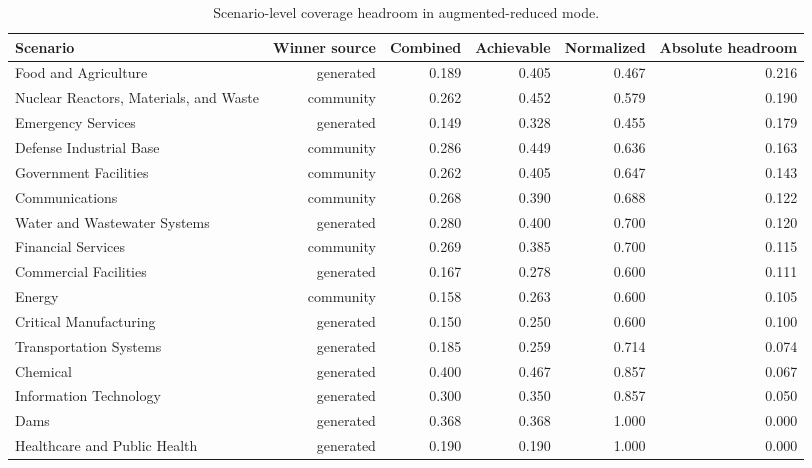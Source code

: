\begin{table}[tb]
\centering
\caption{Scenario-level coverage headroom in augmented-reduced mode.}
\label{tab:corrected_scenario_headroom}
\begin{tabular}{lrrrrr}
\toprule
Scenario & Winner source & Combined & Achievable & Normalized & Absolute headroom \\
\midrule
Food and Agriculture & generated & 0.189 & 0.405 & 0.467 & 0.216 \\
Nuclear Reactors, Materials, and Waste & community & 0.262 & 0.452 & 0.579 & 0.190 \\
Emergency Services & generated & 0.149 & 0.328 & 0.455 & 0.179 \\
Defense Industrial Base & community & 0.286 & 0.449 & 0.636 & 0.163 \\
Government Facilities & community & 0.262 & 0.405 & 0.647 & 0.143 \\
Communications & community & 0.268 & 0.390 & 0.688 & 0.122 \\
Water and Wastewater Systems & generated & 0.280 & 0.400 & 0.700 & 0.120 \\
Financial Services & community & 0.269 & 0.385 & 0.700 & 0.115 \\
Commercial Facilities & generated & 0.167 & 0.278 & 0.600 & 0.111 \\
Energy & community & 0.158 & 0.263 & 0.600 & 0.105 \\
Critical Manufacturing & generated & 0.150 & 0.250 & 0.600 & 0.100 \\
Transportation Systems & generated & 0.185 & 0.259 & 0.714 & 0.074 \\
Chemical & generated & 0.400 & 0.467 & 0.857 & 0.067 \\
Information Technology & generated & 0.300 & 0.350 & 0.857 & 0.050 \\
Dams & generated & 0.368 & 0.368 & 1.000 & 0.000 \\
Healthcare and Public Health & generated & 0.190 & 0.190 & 1.000 & 0.000 \\
\bottomrule
\end{tabular}
\end{table}
